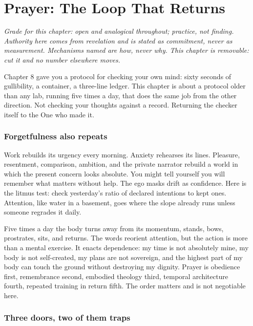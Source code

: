 \chapter*{Prayer: The Loop That Returns}

\textit{Grade for this chapter: open and analogical throughout; practice, not finding. Authority here comes from revelation and is stated as commitment, never as measurement. Mechanisms named are how, never why. This chapter is removable: cut it and no number elsewhere moves.}

Chapter 8 gave you a protocol for checking your own mind: sixty seconds of gullibility, a container, a three-line ledger. This chapter is about a protocol older than any lab, running five times a day, that does the same job from the other direction. Not checking your thoughts against a record. Returning the checker itself to the One who made it.

\subsection*{Forgetfulness also repeats}

Work rebuilds its urgency every morning. Anxiety rehearses its lines. Pleasure, resentment, comparison, ambition, and the private narrator rebuild a world in which the present concern looks absolute. You might tell yourself you will remember what matters without help. The ego masks drift as confidence. Here is the litmus test: check yesterday's ratio of declared intentions to kept ones. Attention, like water in a basement, goes where the slope already runs unless someone regrades it daily.

Five times a day the body turns away from its momentum, stands, bows, prostrates, sits, and returns. The words reorient attention, but the action is more than a mental exercise. It enacts dependence: my time is not absolutely mine, my body is not self-created, my plans are not sovereign, and the highest part of my body can touch the ground without destroying my dignity. Prayer is obedience first, remembrance second, embodied theology third, temporal architecture fourth, repeated training in return fifth. The order matters and is not negotiable here.

\subsection*{Three doors, two of them traps}

